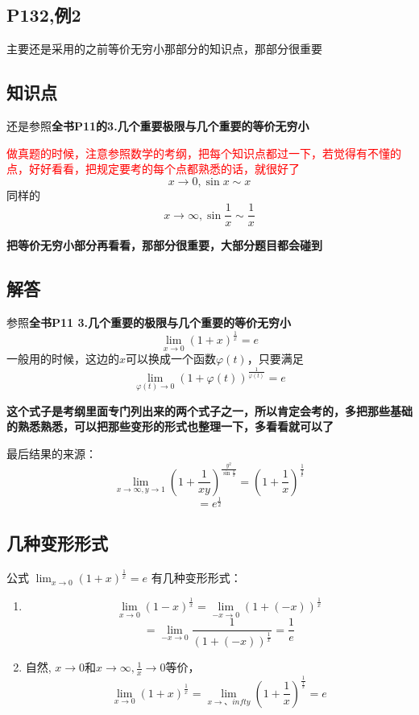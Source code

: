 \documentclass[a4paper]{ctexart}
\begin{document}
\begin{multicols}{2}
\section{P132,例2}
主要还是采用的之前等价无穷小那部分的知识点，那部分很重要

\subsection{知识点}
\par
还是参照\textbf{全书P11的3.几个重要极限与几个重要的等价无穷小}
\par
\textcolor{red}{做真题的时候，注意参照数学的考纲，把每个知识点都过一下，若觉得有不懂的点，好好看看，把规定要考的每个点都熟悉的话，就很好了}
$$
x\rightarrow 0, \sin{x} \sim x
$$
同样的
$$
x\rightarrow \infty, \sin{\frac{1}{x}} \sim \frac{1}{x}
$$
\par
\textbf{把等价无穷小部分再看看，那部分很重要，大部分题目都会碰到}

\subsection{解答}
参照\textbf{全书P11 \quad 3.几个重要的极限与几个重要的等价无穷小}
$$
\lim_{x\rightarrow 0}{(1+x)^\frac{1}{x}} = e
$$
一般用的时候，这边的$x$可以换成一个函数$\varphi(t)$，只要满足
$$
\lim_{\varphi(t)\rightarrow 0}{(1+\varphi(t))^\frac{1}{\varphi(t)}} = e
$$
\par
\textbf{这个式子是考纲里面专门列出来的两个式子之一，所以肯定会考的，多把那些基础的熟悉熟悉，可以把那些变形的形式也整理一下，多看看就可以了}
\par
最后结果的来源：
$$
\lim_{x\rightarrow \infty,y\rightarrow 1}
{
    (1+ \frac{1}{xy})^
    {\frac{y^2}{\sin{\frac{2}{x}}}}
}
=
(1+\frac{1}{x}) ^ {\frac{1}{\frac{2}{x}}}
$$
$$
=e^{\frac{1}{2}}
$$

\subsection{几种变形形式}
公式 $ \lim_{x\rightarrow 0}{(1+x)^\frac{1}{x}} = e $
有几种变形形式：
\begin{enumerate}
\item
$$
\lim_{x\rightarrow 0}{(1-x)^\frac{1}{x}} = 
\lim_{-x\rightarrow 0}{(1+(-x))^\frac{1}{x}}  
$$
$$
=\lim_{-x\rightarrow 0}
    {
    \frac{1} {
        (1+(-x))^
        {
            \frac{1}{x}}}  
    }
= \frac{1}{e} 
$$

\item 自然, $x\rightarrow 0$和$x\rightarrow \infty,\frac{1}{x}\rightarrow 0$等价，
$$
\lim_{x\rightarrow 0}{(1+x)^\frac{1}{x}} = 
\lim_{x\rightarrow 、infty}{(1+\frac{1}{x})^\frac{1}{\frac{1}{x}}} = 
e
$$
\end{enumerate}


\end{multicols}
\end{document}
